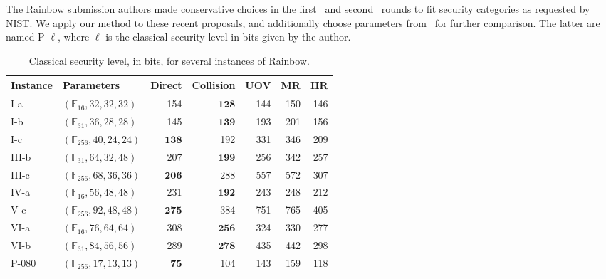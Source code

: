 \documentclass[12pt, a4paper, oneside]{memoir}
\theoremstyle{definition}
\begin{document}
The Rainbow submission authors made conservative choices in the first~\cite{Ding:201712} and second~\cite{Ding:201901} rounds to fit security categories as requested by NIST\@. We apply our method to these recent proposals, and additionally choose parameters from~\cite[Tabs.~6.12,~9.8]{Petzoldt:201307} for further comparison. The latter are named P-$\ell$, where $\ell$ is the classical security level in bits given by the author.

\begin{table}[htbp]
  \renewcommand{\arraystretch}{1.2}
  \setlength{\tabcolsep}{7pt}
  \centering
  \caption{Classical security level, in bits, for several instances of Rainbow.}\label{tab:sec}
  \begin{tabular}{*{2}{l}*{5}{r}}
    \toprule
    Instance & Parameters & Direct & Collision & UOV & MR & HR \\
    \midrule
    I-a    & $(\mathbb{F}_{ 16}, 32, 32, 32)$  &              154 &  $\mathbf{ 128}$ &              144 &              150 &              146 \\
    I-b    & $(\mathbb{F}_{ 31}, 36, 28, 28)$  &              145 &  $\mathbf{ 139}$ &              193 &              201 &              156 \\
    I-c    & $(\mathbb{F}_{256}, 40, 24, 24)$  &  $\mathbf{ 138}$ &              192 &              331 &              346 &              209 \\
    III-b  & $(\mathbb{F}_{ 31}, 64, 32, 48)$  &              207 &  $\mathbf{ 199}$ &              256 &              342 &              257 \\
    III-c  & $(\mathbb{F}_{256}, 68, 36, 36)$  &  $\mathbf{ 206}$ &              288 &              557 &              572 &              307 \\
    IV-a   & $(\mathbb{F}_{ 16}, 56, 48, 48)$  &              231 &  $\mathbf{ 192}$ &              243 &              248 &              212 \\
    V-c    & $(\mathbb{F}_{256}, 92, 48, 48)$  &  $\mathbf{ 275}$ &              384 &              751 &              765 &              405 \\
    VI-a   & $(\mathbb{F}_{ 16}, 76, 64, 64)$  &              308 &  $\mathbf{ 256}$ &              324 &              330 &              277 \\
    VI-b   & $(\mathbb{F}_{ 31}, 84, 56, 56)$  &              289 &  $\mathbf{ 278}$ &              435 &              442 &              298 \\
    P-080  & $(\mathbb{F}_{256}, 17, 13, 13)$  &  $\mathbf{  75}$ &              104 &              143 &              159 &              118 \\

\end{tabular}
\end{table}
\end{document}
